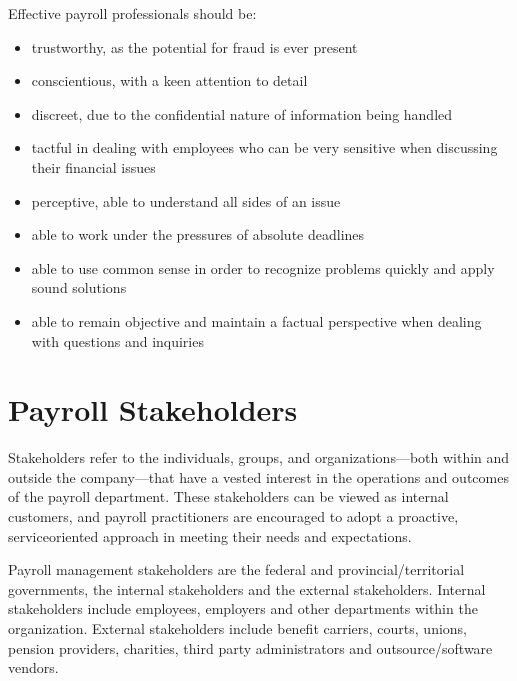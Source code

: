 \documentclass[letterpaper,10pt,english]{sphinxmanual}
\begin{document}
\sphinxAtStartPar
Effective payroll professionals should be:
\begin{itemize}
\item {} 
\sphinxAtStartPar
trustworthy, as the potential for fraud is ever present

\item {} 
\sphinxAtStartPar
conscientious, with a keen attention to detail

\item {} 
\sphinxAtStartPar
discreet, due to the confidential nature of information being handled

\item {} 
\sphinxAtStartPar
tactful in dealing with employees who can be very sensitive when discussing their financial issues

\item {} 
\sphinxAtStartPar
perceptive, able to understand all sides of an issue

\item {} 
\sphinxAtStartPar
able to work under the pressures of absolute deadlines

\item {} 
\sphinxAtStartPar
able to use common sense in order to recognize problems quickly and apply sound solutions

\item {} 
\sphinxAtStartPar
able to remain objective and maintain a factual perspective when dealing with questions and inquiries

\end{itemize}


\section{Payroll Stakeholders}
\label{\detokenize{compliance:payroll-stakeholders}}
\sphinxAtStartPar
Stakeholders refer to the individuals, groups, and organizations—both within and outside the company—that have a vested
interest in the operations and outcomes of the payroll department. These stakeholders can be viewed as internal customers,
and payroll practitioners are encouraged to adopt a proactive, service\sphinxhyphen{}oriented approach in meeting their needs and
expectations.

\sphinxAtStartPar
Payroll management stakeholders are the federal and provincial/territorial governments, the
internal stakeholders and the external stakeholders. Internal stakeholders include employees,
employers and other departments within the organization. External stakeholders include
benefit carriers, courts, unions, pension providers, charities, third party administrators and
outsource/software vendors.
\end{document}
